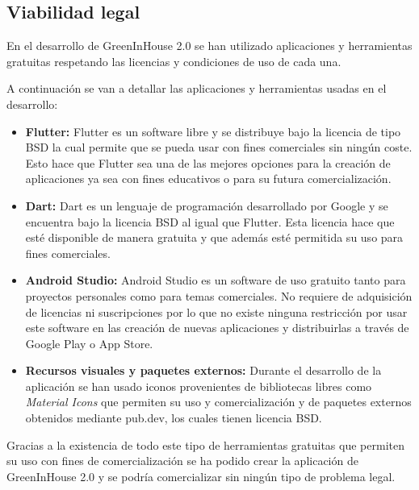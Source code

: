 \subsection{Viabilidad legal}

En el desarrollo de GreenInHouse 2.0 se han utilizado aplicaciones y herramientas gratuitas respetando las licencias y condiciones de uso de cada una.

A continuación se van a detallar las aplicaciones y herramientas usadas en el desarrollo:

\begin{itemize}
    \item \textbf{Flutter:} Flutter es un software libre y se distribuye bajo la licencia de tipo BSD la cual permite que se pueda usar con fines comerciales sin ningún coste. Esto hace que Flutter sea una de las mejores opciones para la creación de aplicaciones ya sea con fines educativos o para su futura comercialización.
    \item \textbf{Dart:} Dart es un lenguaje de programación desarrollado por Google y se encuentra bajo la licencia BSD al igual que Flutter. Esta licencia hace que esté disponible de manera gratuita y que además esté permitida su uso para fines comerciales.
    \item \textbf{Android Studio:} Android Studio es un software de uso gratuito tanto para proyectos personales como para temas comerciales. No requiere de adquisición de licencias ni suscripciones por lo que no existe ninguna restricción por usar este software en las creación de nuevas aplicaciones y distribuirlas a través de Google Play o App Store.
    \item \textbf{Recursos visuales y paquetes externos:} Durante el desarrollo de la aplicación se han usado iconos provenientes de bibliotecas libres como \textit{Material Icons} que permiten su uso y comercialización y de paquetes externos obtenidos mediante pub.dev, los cuales tienen licencia BSD.
\end{itemize}

Gracias a la existencia de todo este tipo de herramientas gratuitas que permiten su uso con fines de comercialización se ha podido crear la aplicación de GreenInHouse 2.0 y se podría comercializar sin ningún tipo de problema legal.


